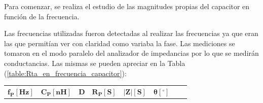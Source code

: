 \documentclass[11pt, a4paper]{article}
\begin{document}
Para comenzar, se realiza el estudio de las magnitudes propias del capacitor en función de la frecuencia. \par Las frecuencias utilizadas fueron detectadas al realizar las frecuencias ya que eran las que permitían ver con claridad como variaba la fase. Las mediciones se tomaron en el modo paralelo del analizador de impedancias por lo que se medirán conductancias. Las mismas se pueden apreciar en la Tabla (\ref{table:Rta_en_frecuencia_capacitor}):

 \begin{center}
     \begin{table}[H]
     \centering
     \renewcommand{\arraystretch}{1.1}
         \begin{tabular}{ c c c c c c c c }
            \hline 
             $\bm{f_P[Hz]}$ &  $\bm{C_P[nH]}$ & $\bm{D}$& $\bm{R_P[S]}$ & $\bm{|Z|[S]}$ & $\bm{\theta}[^\circ]$ \\


\end{tabular}
\end{table}
\end{center}
\end{document}
